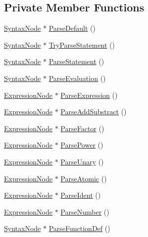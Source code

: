 \subsection*{Private Member Functions}
\begin{DoxyCompactItemize}
\item 
\hyperlink{classSyntaxNode}{Syntax\+Node} $\ast$ \hyperlink{classParser_aca8329fb5ee4812398144fd1d647fe39}{Parse\+Default} ()
\item 
\hyperlink{classSyntaxNode}{Syntax\+Node} $\ast$ \hyperlink{classParser_aeef41071b484e09942290ab55953dc4f}{Try\+Parse\+Statement} ()
\item 
\hyperlink{classSyntaxNode}{Syntax\+Node} $\ast$ \hyperlink{classParser_a370277018ad3e0e157a8ff5849892f7d}{Parse\+Statement} ()
\item 
\hyperlink{classSyntaxNode}{Syntax\+Node} $\ast$ \hyperlink{classParser_a19c5b6055d066d21ad39a32287e833c2}{Parse\+Evaluation} ()
\item 
\hyperlink{classExpressionNode}{Expression\+Node} $\ast$ \hyperlink{classParser_ae46b0a87abe76f40ae117c5bdcb2f29d}{Parse\+Expression} ()
\item 
\hyperlink{classExpressionNode}{Expression\+Node} $\ast$ \hyperlink{classParser_a47ba11ddd167c1b0b5cf1d2fd1cf1ccd}{Parse\+Add\+Substract} ()
\item 
\hyperlink{classExpressionNode}{Expression\+Node} $\ast$ \hyperlink{classParser_a70c674c7b40f7a0ab1df0523c4c8c530}{Parse\+Factor} ()
\item 
\hyperlink{classExpressionNode}{Expression\+Node} $\ast$ \hyperlink{classParser_ad6ccc6e873d1fb3dcfa142655a5b0732}{Parse\+Power} ()
\item 
\hyperlink{classExpressionNode}{Expression\+Node} $\ast$ \hyperlink{classParser_a446237993f806a92dd3e78ba8019f4f5}{Parse\+Unary} ()
\item 
\hyperlink{classExpressionNode}{Expression\+Node} $\ast$ \hyperlink{classParser_ac1a69267c9414b54a4b592c9ad084780}{Parse\+Atomic} ()
\item 
\hyperlink{classExpressionNode}{Expression\+Node} $\ast$ \hyperlink{classParser_a84af27a6f4e42888eba6ac36ccd0815c}{Parse\+Ident} ()
\item 
\hyperlink{classExpressionNode}{Expression\+Node} $\ast$ \hyperlink{classParser_a769d580b14d3d097ed255ad869cc1653}{Parse\+Number} ()
\item 
\hyperlink{classSyntaxNode}{Syntax\+Node} $\ast$ \hyperlink{classParser_a0e8b1f794af2b9923bc3fcb7498004f9}{Parse\+Function\+Def} ()
\item 

\end{DoxyCompactItemize}
